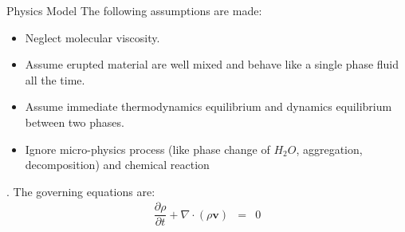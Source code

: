 \documentclass[final]{beamer}
\newlength{\onecolwid}
\begin{document}
\begin{frame}[t]
\begin{columns}[t]
\begin{column}{\onecolwid}

\begin{block}{Physics Model \cite{suzuki2005numerical}}
The following assumptions are made:
\begin{itemize}
\item Neglect molecular viscosity.
\item Assume erupted material are well mixed and behave like a single phase fluid all the time.
\item Assume immediate thermodynamics equilibrium and dynamics equilibrium between two phases.
\item Ignore micro-physics process (like phase change of $H_2O$, aggregation, decomposition) and chemical reaction
\end{itemize}.
The governing equations are:
\begin{eqnarray} %
\dfrac{\partial \rho}{\partial t} + \nabla \cdot (\rho \textbf{v}) &=& 0 \label{eq:gov-cs-rho} \\

\end{eqnarray}
\end{block}
\end{column}
\end{columns}
\end{frame}
\end{document}
